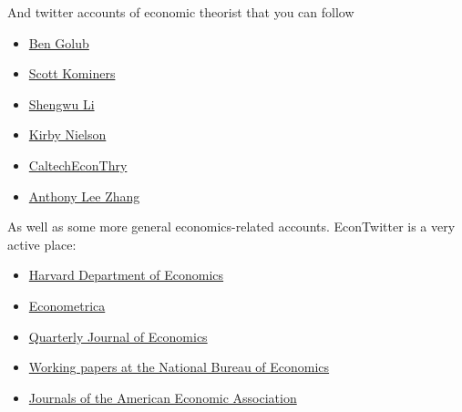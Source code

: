 And twitter accounts of economic theorist that you can follow 
\begin{itemize}
    \item \href{https://twitter.com/ben_golub}{Ben Golub}
    \item \href{https://twitter.com/skominers}{Scott Kominers}
    \item \href{https://twitter.com/ShengwuLi}{Shengwu Li}
    \item \href{https://twitter.com/KirbyKNielsen}{Kirby Nielson}
    \item \href{https://twitter.com/CaltechEconThry}{CaltechEconThry}
    \item \href{https://twitter.com/AnthonyLeeZhang}{Anthony Lee Zhang}
\end{itemize}
As well as some more general economics-related accounts. EconTwitter is a very active place:
\begin{itemize}
    \item \href{https://twitter.com/HarvardEcon}{Harvard Department of Economics}
    \item \href{https://twitter.com/ecmaEditors}{Econometrica}
    \item \href{https://twitter.com/QJEHarvard}{Quarterly Journal of Economics}
    \item \href{https://twitter.com/nberpubs}{Working papers at the National Bureau of Economics}
    \item \href{https://twitter.com/AEAjournals}{Journals of the American Economic Association}
\end{itemize}

